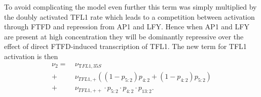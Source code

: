 To avoid complicating the model even further this term was simply multiplied by the doubly activated TFL1 rate which leads to a competition between activation through FTFD and repression from AP1 and LFY.
Hence when AP1 and LFY are present at high concentration they will be dominantly repressive over the effect of direct FTFD-induced transcription of TFL1.
The new term for TFL1 activation is then
\begin{equation*}
\begin{split}
\nu_2 = \ &\nu_{\mathrm TFL1, 35S} \\ +\ & \nu_{TFL1,+}((1 - p_{5:2})p_{4:2} + (1 - p_{4:2})p_{5:2}) \\ +\ & \nu_{TFL1,++}\cdot p_{5:2}\cdot p_{4:2}\cdot p_{13:2}.
\end{split}
\end{equation*}

